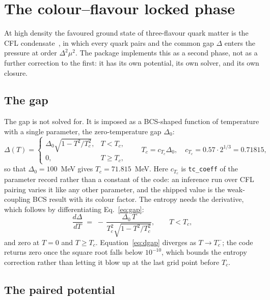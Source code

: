 \documentclass[aps,prc,onecolumn,superscriptaddress,nofootinbib,10pt]{revtex4-2}
\begin{document}
\section{The colour--flavour locked phase}
\label{sec:cfl}

At high density the favoured ground state of three-flavour quark matter is the
CFL condensate~\cite{AlfordRajagopalWilczek1999}, in which every quark pairs
and the common gap $\Delta$ enters the pressure at order $\Delta^2 \mu^2$. The
package implements this as a second phase, not as a further correction to the
first: it has its own potential, its own solver, and its own closure.

\subsection{The gap}

The gap is not solved for. It is imposed as a BCS-shaped function of
temperature with a single parameter, the zero-temperature gap $\Delta_0$:
%
\begin{equation}
\Delta(T) = \begin{cases}
   \Delta_0 \sqrt{1 - T^2/T_c^2} , & T < T_c , \\[2pt]
   0 , & T \ge T_c ,
\end{cases}
\qquad
T_c = c_{T_c} \Delta_0 , \quad c_{T_c} = 0.57 \cdot 2^{1/3} = 0.71815 ,
\label{eq:gap}
\end{equation}
%
so that $\Delta_0 = 100$~MeV gives $T_c = 71.815$~MeV. Here $c_{T_c}$ is
\texttt{tc\_coeff} of the parameter record rather than a constant of the code:
an inference run over CFL pairing varies it like any other parameter, and the
shipped value is the weak-coupling BCS result with its colour factor. The entropy needs the
derivative, which follows by differentiating Eq.~\eqref{eq:gap}:
%
\begin{equation}
\frac{d\Delta}{dT} \;=\; -\,\frac{\Delta_0\, T}{T_c^2 \sqrt{1 - T^2/T_c^2}} ,
\qquad T < T_c ,
\label{eq:dgap}
\end{equation}
%
and zero at $T = 0$ and $T \ge T_c$. Equation~\eqref{eq:dgap} diverges as
$T \to T_c^-$; the code returns zero once the square root falls below
$10^{-10}$, which bounds the entropy correction rather than letting it blow
up at the last grid point before $T_c$.

\subsection{The paired potential}
\end{document}
